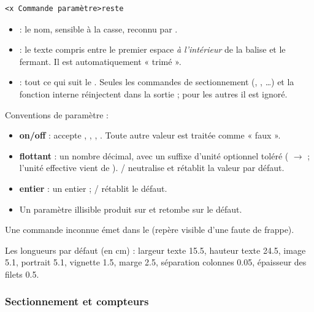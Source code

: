 \begin{verbatim}
<x Commande paramètre>reste
\end{verbatim}

\begin{itemize}
  \item \textbf{} : le nom, sensible à la casse, reconnu par
        .
  \item \textbf{} : le texte compris entre le premier espace
        \emph{à l'intérieur} de la balise et le \cmd{>} fermant. Il est
        automatiquement « trimé ».
  \item \textbf{} : tout ce qui suit le \cmd{>}. Seules les
        commandes de sectionnement (, , \ldots) et
        la fonction interne  réinjectent  dans la sortie ;
        pour les autres il est ignoré.
\end{itemize}

Conventions de paramètre :

\begin{itemize}
  \item \textbf{on/off} : accepte , , , .
        Toute autre valeur est traitée comme « faux ».
  \item \textbf{flottant} : un nombre décimal, avec un suffixe d'unité
        optionnel toléré (\cmd{-1.5cm} $\to$  ; l'unité effective
        vient de ). / neutralise et rétablit
        la valeur par défaut.
  \item \textbf{entier} : un entier ; / rétablit le défaut.
  \item Un paramètre illisible produit  sur 
        et retombe sur le défaut.
\end{itemize}

Une commande inconnue émet  dans le  (repère
visible d'une faute de frappe).

Les longueurs par défaut (en cm) : largeur texte 15.5, hauteur texte 24.5,
image 5.1, portrait 5.1, vignette 1.5, marge 2.5, séparation colonnes 0.05,
épaisseur des filets 0.5.

\vspace{1em}

\subsubsection*{Sectionnement et compteurs}

